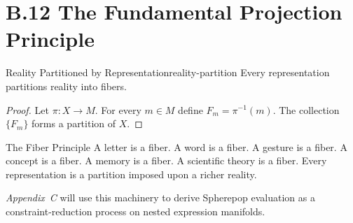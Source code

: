 \section*{B.12 The Fundamental Projection Principle}

\begin{theorem}{Reality Partitioned by Representation}{reality-partition}
  Every representation partitions reality into fibers.
\end{theorem}

\begin{proof}
  Let $\pi : X \to M$. For every $m \in M$ define $F_m = \pi^{-1}(m)$.
  The collection $\{F_m\}$ forms a partition of $X$.
\end{proof}

\begin{namedthm}{The Fiber Principle}
  A letter is a fiber. A word is a fiber. A gesture is a fiber.
  A concept is a fiber. A memory is a fiber. A scientific theory is a fiber.
  Every representation is a partition imposed upon a richer reality.
\end{namedthm}

\medskip
\textit{Appendix~C} will use this machinery to derive Spherepop evaluation as
a constraint-reduction process on nested expression manifolds.

